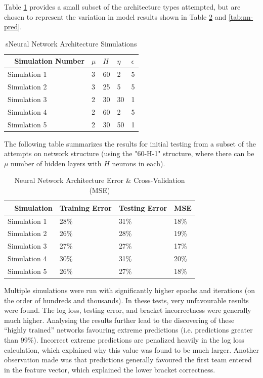 \documentclass[conference]{IEEEtran}
\begin{document}
{Table \ref{tab:nn-sims} provides a small subset of the architecture types attempted, but are chosen to represent the variation in model results shown in Table \ref{tab:nn-error} and \ref{tab:nn-pred}.
\begin{table}[H]
	\centering
    \begin{tabular}{|l|l|l|l|l|}
    \hline
    ~    \textbf{Simulation Number} & \textbf{$\mu$} & \textbf{$H$} & \textbf{$\eta$} & \textbf{$\epsilon$}\\ \hline
    	Simulation 1 						& 3 			& 60 		& 2 				& 5			\\ \hline
    	Simulation 2 						& 3 			& 25 		& 5 				& 5 		\\ \hline
    	Simulation 3 						& 2 			& 30 		& 30 				& 1 		\\ \hline
    	Simulation 4						& 2 			& 60 		& 2 				& 5 		\\ \hline    
    	Simulation 5 						& 2 			& 30 		& 50 				& 1 \\ \hline
    \end{tabular}
    \caption {sNeural Network Architecture Simulations}
    \label{tab:nn-sims}
\end{table}

The following table summarizes the results for initial testing from a subset of the attempts on network structure (using the "60-H-1" structure, where there can be $\mu$ number of hidden layers with $H$ neurons in each).

\begin{table}[H]
	\centering
    \begin{tabular}{|l|l|l|l|}
    \hline
    ~   \textbf{Simulation} & \textbf{Training Error} & \textbf{Testing Error} & \textbf{MSE}\\ \hline
    	Simulation 1 		& 28\% 						& 31\% 					& 18\% \\ \hline
	    Simulation 2 		& 26\% 						& 28\% 					& 19\% \\ \hline
	    Simulation 3 		& 27\% 						& 27\% 					& 17\% \\ \hline %
	    Simulation 4 		& 30\% 						& 31\% 					& 20\% \\ \hline
	    Simulation 5 		& 26\% 						& 27\% 					& 18\% \\ \hline %
    \end{tabular}
    \caption {Neural Network Architecture Error \& Cross-Validation (MSE)}
    \label{tab:nn-error}
\end{table}

Multiple simulations were run with significantly higher epochs and iterations (on the order of hundreds and thousands). 
In these tests, very unfavourable results were found. 
The log loss, testing error, and bracket incorrectness were generally much higher.
Analysing the results further lead to the discovering of these ``highly trained'' networks favouring extreme predictions (i.e. predictions greater than 99\%).
Incorrect extreme predictions are penalized heavily in the log loss calculation, which explained why this value was found to be much larger.
Another observation made was that predictions generally favoured the first team entered in the feature vector, which explained the lower bracket correctness.

}
\end{document}
